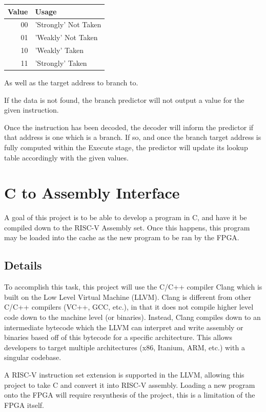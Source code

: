 \documentclass[11pt]{article}
\begin{document}
\begin{center}
\begin{tabular}{rl}
Value & Usage\\
\hline
00 & 'Strongly' Not Taken\\
01 & 'Weakly' Not Taken\\
10 & 'Weakly' Taken\\
11 & 'Strongly' Taken\\
\end{tabular}
\end{center}

As well as the target address to branch to. 

If the data is not found, the branch predictor will not output a value for the given instruction.

Once the instruction has been decoded, the decoder will inform the predictor if that address is one which is a branch. If so, and once the branch target address is fully computed within the Execute stage, the predictor will update its lookup table accordingly with the given values.

\section{C to Assembly Interface}
\label{sec-4}
A goal of this project is to be able to develop a program in C, and have it be compiled down to the RISC-V Assembly set. Once this happens, this program may be loaded into the cache as the new program to be ran by the FPGA.

\subsection{Details}
\label{sec-4-1}
To accomplish this task, this project will use the C/C++ compiler Clang which is built on the Low Level Virtual Machine (LLVM). Clang is different from other C/C++ compilers (VC++, GCC, etc.), in that it does not compile higher level code down to the machine level (or binaries). Instead, Clang compiles down to an intermediate bytecode which the LLVM can interpret and write assembly or binaries based off of this bytecode for a specific architecture. This allows developers to target multiple architectures (x86, Itanium, ARM, etc.) with a singular codebase.

A RISC-V instruction set extension is supported in the LLVM, allowing this project to take C and convert it into RISC-V assembly. Loading a new program onto the FPGA will require resynthesis of the project, this is a limitation of the FPGA itself.
\end{document}

